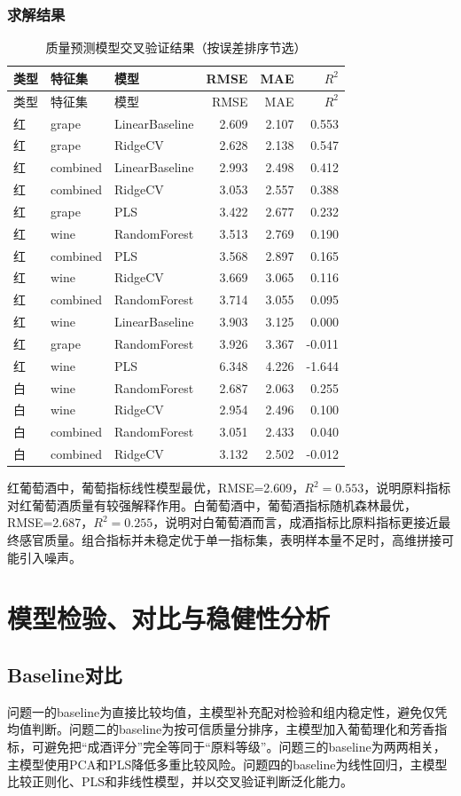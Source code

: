 \documentclass[UTF8,a4paper,12pt]{ctexart}
\begin{document}
\subsubsection{求解结果}
\begin{longtable}{lllrrr}\caption{质量预测模型交叉验证结果（按误差排序节选）}\\\toprule 类型 & 特征集 & 模型 & RMSE & MAE & $R^2$\\\midrule\endfirsthead\toprule 类型 & 特征集 & 模型 & RMSE & MAE & $R^2$\\\midrule\endhead
红 & grape & LinearBaseline & 2.609 & 2.107 & 0.553 \\
红 & grape & RidgeCV & 2.628 & 2.138 & 0.547 \\
红 & combined & LinearBaseline & 2.993 & 2.498 & 0.412 \\
红 & combined & RidgeCV & 3.053 & 2.557 & 0.388 \\
红 & grape & PLS & 3.422 & 2.677 & 0.232 \\
红 & wine & RandomForest & 3.513 & 2.769 & 0.190 \\
红 & combined & PLS & 3.568 & 2.897 & 0.165 \\
红 & wine & RidgeCV & 3.669 & 3.065 & 0.116 \\
红 & combined & RandomForest & 3.714 & 3.055 & 0.095 \\
红 & wine & LinearBaseline & 3.903 & 3.125 & 0.000 \\
红 & grape & RandomForest & 3.926 & 3.367 & -0.011 \\
红 & wine & PLS & 6.348 & 4.226 & -1.644 \\
白 & wine & RandomForest & 2.687 & 2.063 & 0.255 \\
白 & wine & RidgeCV & 2.954 & 2.496 & 0.100 \\
白 & combined & RandomForest & 3.051 & 2.433 & 0.040 \\
白 & combined & RidgeCV & 3.132 & 2.502 & -0.012 \\
\bottomrule\end{longtable}
红葡萄酒中，葡萄指标线性模型最优，RMSE=2.609，$R^2=0.553$，说明原料指标对红葡萄酒质量有较强解释作用。白葡萄酒中，葡萄酒指标随机森林最优，RMSE=2.687，$R^2=0.255$，说明对白葡萄酒而言，成酒指标比原料指标更接近最终感官质量。组合指标并未稳定优于单一指标集，表明样本量不足时，高维拼接可能引入噪声。
\section{模型检验、对比与稳健性分析}
\subsection{Baseline对比}
问题一的baseline为直接比较均值，主模型补充配对检验和组内稳定性，避免仅凭均值判断。问题二的baseline为按可信质量分排序，主模型加入葡萄理化和芳香指标，可避免把“成酒评分”完全等同于“原料等级”。问题三的baseline为两两相关，主模型使用PCA和PLS降低多重比较风险。问题四的baseline为线性回归，主模型比较正则化、PLS和非线性模型，并以交叉验证判断泛化能力。
\end{document}

